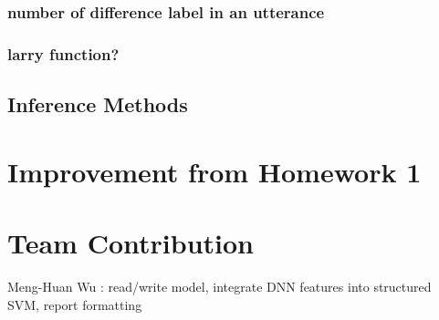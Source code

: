 \documentclass[12pt]{article}%
\begin{document}
\subsubsection{number of difference label in an utterance}
\subsubsection{larry function?}
\subsection{Inference Methods}


\section{Improvement from Homework 1}

\section{Team Contribution}
Meng-Huan Wu : read/write model, integrate DNN features into structured SVM, report formatting
\end{document}
